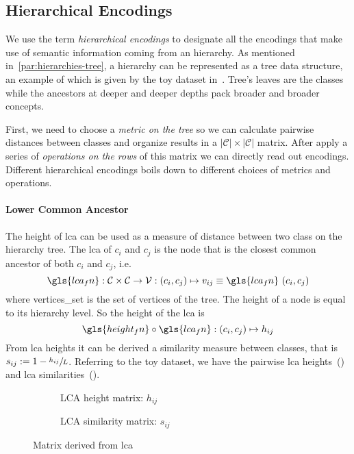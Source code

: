 \subsection{Hierarchical Encodings}
\label{subsec:hierarchical-encodings}

We use the term \emph{hierarchical encodings} to designate all the encodings
that make use of semantic information coming from an hierarchy. As mentioned
in~\cref{par:hierarchies-tree}, a hierarchy can be represented as a tree data
structure, an example of which is given by the toy dataset
in~. Tree's leaves are the classes while the ancestors
at deeper and deeper depths pack broader and broader concepts.

First, we need to choose a \emph{metric on the tree} so we can calculate
pairwise distances between classes and organize results in a $|\mathcal{C}|
\times |\mathcal{C}|$ matrix. After apply a series of \emph{operations on the
rows} of this matrix we can directly read out encodings. Different hierarchical
encodings boils down to different choices of metrics and operations.

\paragraph{Lower Common Ancestor}
The height of \acrfull{lca} can be used as a measure of distance between two
class on the hierarchy tree. The \acrshort{lca} of $c_i$ and $c_j$ is the node
that is the closest common ancestor of both $c_i$ and $c_j$, i.e.\
\begin{equation}
  \gls{lca_fn} : \mathcal{C} \times \mathcal{C} \to \mathcal{V}:
  \left(c_i, c_j\right) \mapsto v_{ij} \equiv
  \gls{lca_fn} \, \left(c_i, c_j\right)
  \label{eq:lca}
\end{equation}
where \gls{vertices_set} is the set of vertices of the tree. The height of a
node is equal to its hierarchy level. So the height of the \acrshort{lca} is
\begin{equation}
  \gls{height_fn} \circ \gls{lca_fn} : \left(c_i, c_j\right) \mapsto h_{ij}
  \label{eq:lca-height}
\end{equation}
From \acrshort{lca} heights it can be derived a similarity measure between
classes, that is $s_{ij} := 1 - \sfrac{h_{ij}}{L}$. Referring to the toy
dataset, we have the pairwise \acrshort{lca}
heights~() and \acrshort{lca}
similarities~().
\begin{figure}[htbp]
  \begin{subfigure}{0.45\textwidth}
    \caption{LCA height matrix: $h_{ij}$}
    \label{fig:03/lca-height-matrix}
  \end{subfigure}
  \begin{subfigure}{0.45\textwidth}
    \caption{LCA similarity matrix: $s_{ij}$}
    \label{fig:03/lca-similarity-matrix}
  \end{subfigure}
  \caption{Matrix derived from \acrlong{lca}}
\end{figure}

